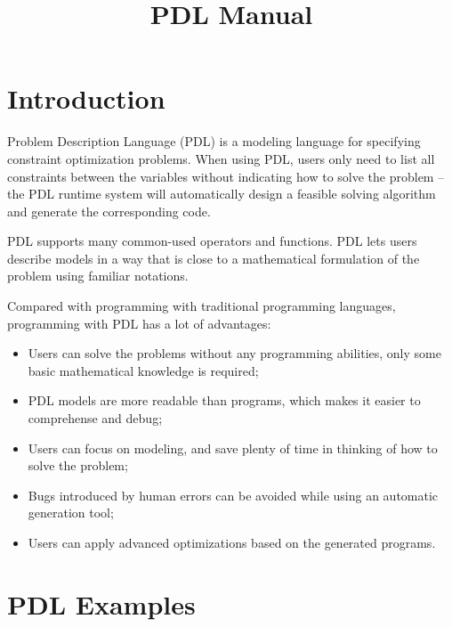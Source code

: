 \documentclass{report}
\title{PDL Manual}
\author{}
\date{}
\begin{document}

\maketitle

\tableofcontents

\thispagestyle{empty}

\setcounter{page}{1}

\chapter{Introduction}

Problem Description Language (PDL) is a modeling language for specifying constraint optimization problems. When using PDL, users only need to list all constraints between the variables without indicating how to solve the problem -- the PDL runtime system will automatically design a feasible solving algorithm and generate the corresponding code.

PDL supports many common-used operators and functions. PDL lets users describe models in a way that is close to a mathematical formulation of the problem using familiar notations.

Compared with programming with traditional programming languages, programming with PDL has a lot of advantages:
\begin{itemize}
    \item Users can solve the problems without any programming abilities, only some basic mathematical knowledge is required;
    \item PDL models are more readable than programs, which makes it easier to comprehense and debug;
    \item Users can focus on modeling, and save plenty of time in thinking of how to solve the problem;
    \item Bugs introduced by human errors can be avoided while using an automatic generation tool;
    \item Users can apply advanced optimizations based on the generated programs.
\end{itemize}

\chapter{PDL Examples}
\end{document}
